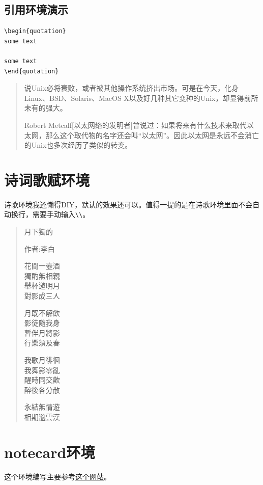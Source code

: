 \documentclass[11pt,oneside]{book}
\begin{document}
\subsection{引用环境演示}
\begin{Verbatim}
\begin{quotation}
some text

some text
\end{quotation}
\end{Verbatim}


\begin{quotation}
说Unix必将衰败，或者被其他操作系统挤出市场。可是在今天，化身Linux、BSD、Solaris、MacOS X以及好几种其它变种的Unix，却显得前所未有的强大。

Robert Metcalf[以太网络的发明者]曾说过：如果将来有什么技术来取代以太网，那么这个取代物的名字还会叫“以太网”。因此以太网是永远不会消亡的Unix也多次经历了类似的转变。
\end{quotation}



\section{诗词歌赋环境}
诗歌环境我还懒得DIY，默认的效果还可以。值得一提的是在诗歌环境里面不会自动换行，需要手动输入\verb+\\+。

\begin{verse}
\centering\noindent
月下獨酌

作者:李白

花間一壺酒\\
獨酌無相親\\
舉杯邀明月\\
對影成三人

月既不解飲\\
影徒隨我身\\
暫伴月將影\\
行樂須及春

我歌月徘徊\\
我舞影零亂\\
醒時同交歡\\
醉後各分散

永結無情遊\\
相期邈雲漢
\end{verse}


\section{notecard环境}
这个环境编写主要参考\href{http://tex.stackexchange.com/questions/127612/color-text-and-bg-of-verbatim-without-affecting-fancyvrb-line-numbers}{这个网站}。
\end{document}
